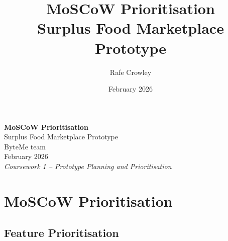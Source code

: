 \documentclass[12pt]{article}
\title{\Huge \textbf{MoSCoW Prioritisation}\\[0.5em]
\Large Surplus Food Marketplace Prototype}
\author{Rafe Crowley}
\date{February 2026}
\begin{document}
\begin{titlepage}
\centering
\vspace*{3cm}
{\Huge \textbf{MoSCoW Prioritisation}}\\[1em]
{\Large Surplus Food Marketplace Prototype}\\[3em]
{\large ByteMe team}\\
{\large February 2026}\\[4em]
\textit{Coursework 1 – Prototype Planning and Prioritisation}
\vfill
\end{titlepage}

\section{MoSCoW Prioritisation}
\subsection{Feature Prioritisation}

\renewcommand{\arraystretch}{1.25}
\end{document}
